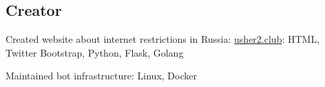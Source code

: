 \documentclass[letter,10pt]{article}
\begin{document}
\subsection{{Creator}}
\begin{zitemize}
\item Created website about internet restrictions in Russia: \href{https://usher2.club}{usher2.club}: HTML, Twitter Bootstrap, Python, Flask, Golang
\item Maintained bot infrastructure: Linux, Docker
\end{zitemize}
\end{document}
